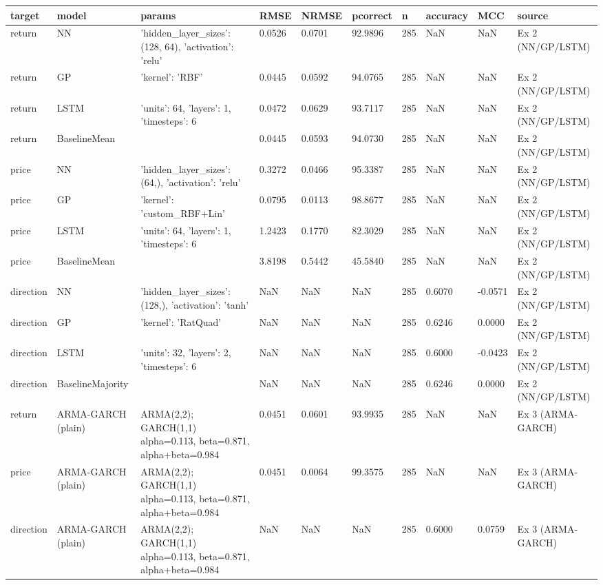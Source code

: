\begin{table}[H]
\centering
\small
\begin{tabular}{llllllllll}
\toprule
target & model & params & RMSE & NRMSE & pcorrect & n & accuracy & MCC & source \\
\midrule
return & NN & {'hidden_layer_sizes': (128, 64), 'activation': 'relu'} & 0.0526 & 0.0701 & 92.9896 & 285 & NaN & NaN & Ex 2 (NN/GP/LSTM) \\
return & GP & {'kernel': 'RBF'} & 0.0445 & 0.0592 & 94.0765 & 285 & NaN & NaN & Ex 2 (NN/GP/LSTM) \\
return & LSTM & {'units': 64, 'layers': 1, 'timesteps': 6} & 0.0472 & 0.0629 & 93.7117 & 285 & NaN & NaN & Ex 2 (NN/GP/LSTM) \\
return & BaselineMean & {} & 0.0445 & 0.0593 & 94.0730 & 285 & NaN & NaN & Ex 2 (NN/GP/LSTM) \\
price & NN & {'hidden_layer_sizes': (64,), 'activation': 'relu'} & 0.3272 & 0.0466 & 95.3387 & 285 & NaN & NaN & Ex 2 (NN/GP/LSTM) \\
price & GP & {'kernel': 'custom_RBF+Lin'} & 0.0795 & 0.0113 & 98.8677 & 285 & NaN & NaN & Ex 2 (NN/GP/LSTM) \\
price & LSTM & {'units': 64, 'layers': 1, 'timesteps': 6} & 1.2423 & 0.1770 & 82.3029 & 285 & NaN & NaN & Ex 2 (NN/GP/LSTM) \\
price & BaselineMean & {} & 3.8198 & 0.5442 & 45.5840 & 285 & NaN & NaN & Ex 2 (NN/GP/LSTM) \\
direction & NN & {'hidden_layer_sizes': (128,), 'activation': 'tanh'} & NaN & NaN & NaN & 285 & 0.6070 & -0.0571 & Ex 2 (NN/GP/LSTM) \\
direction & GP & {'kernel': 'RatQuad'} & NaN & NaN & NaN & 285 & 0.6246 & 0.0000 & Ex 2 (NN/GP/LSTM) \\
direction & LSTM & {'units': 32, 'layers': 2, 'timesteps': 6} & NaN & NaN & NaN & 285 & 0.6000 & -0.0423 & Ex 2 (NN/GP/LSTM) \\
direction & BaselineMajority & {} & NaN & NaN & NaN & 285 & 0.6246 & 0.0000 & Ex 2 (NN/GP/LSTM) \\
return & ARMA-GARCH (plain) & ARMA(2,2); GARCH(1,1) alpha=0.113, beta=0.871, alpha+beta=0.984 & 0.0451 & 0.0601 & 93.9935 & 285 & NaN & NaN & Ex 3 (ARMA-GARCH) \\
price & ARMA-GARCH (plain) & ARMA(2,2); GARCH(1,1) alpha=0.113, beta=0.871, alpha+beta=0.984 & 0.0451 & 0.0064 & 99.3575 & 285 & NaN & NaN & Ex 3 (ARMA-GARCH) \\
direction & ARMA-GARCH (plain) & ARMA(2,2); GARCH(1,1) alpha=0.113, beta=0.871, alpha+beta=0.984 & NaN & NaN & NaN & 285 & 0.6000 & 0.0759 & Ex 3 (ARMA-GARCH) \\

\end{tabular}
\end{table}
